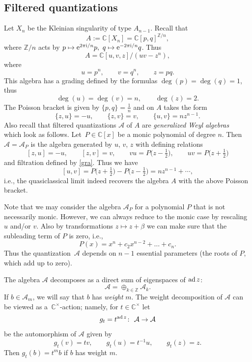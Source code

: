 \documentclass[10pt,a4paper]{amsart}
\newcommand{\CN}{\mathbb{C}} %
\newcommand{\ZN}{\mathbb{Z}} %
\newcommand{\ad}{\ensuremath\operatorname{ad}}
\newcommand{\mc}[1]{\mathcal{#1}}
\theoremstyle{definition}
\numberwithin{equation}{section}
\begin{document}
\subsection{Filtered quantizations}
Let $X_n$ be the Kleinian singularity of type $A_{n-1}$.
Recall that
\[
A:=\mathbb C[X_n]=\CN[p,q]^{\mathbb Z/n},
\]
where
$\mathbb Z/n$ acts by $p\mapsto {\rm e}^{2\pi {\rm i}/n}p,\ q\mapsto {\rm e}^{-2\pi {\rm i}/n}q$.
Thus
\[
A=\mathbb C[u,v,z]/(uv-z^n),
\]
where
\[
u=p^n,\qquad
v=q^n,\qquad
z=pq.
\]
This algebra has a grading defined by the formulas $\deg(p)=\deg(q)=1$, thus
\begin{equation}\label{gra}
 \deg(u)=\deg(v)=n,\qquad
 \deg(z)=2.
 \end{equation}
The Poisson bracket is given by $\lbrace{p,q\rbrace}=\frac{1}{n}$
and on $A$ takes the form
\[
 \lbrace z,u\rbrace =-u,\qquad
 \lbrace z,v\rbrace=v,\qquad
 \lbrace u,v\rbrace=nz^{n-1}.
\]
Also recall that filtered quantizations $\mathcal A$ of $A$ are {\it generalized Weyl algebras}~\cite{B} which look as follows. Let~$P\in \mathbb C[x]$ be a monic polynomial of degree $n$. Then $\mc{A}=\mc A_P$ is the algebra generated by $u$, $v$, $z$ with defining relations
\[
[z,u]=-u,\qquad
[z,v]=v,\qquad
vu=P\big(z-\tfrac{1}{2}\big),\qquad
uv=P\big(z+\tfrac{1}{2}\big)
\]
and filtration defined by \eqref{gra}.
Thus we have
\[
[u,v]=P\big(z+\tfrac{1}{2}\big)-P\big(z-\tfrac{1}{2}\big)=nz^{n-1}+\cdots ,
\]
i.e., the quasiclassical limit indeed recovers the algebra $A$ with the above Poisson bracket.

Note that we may consider the algebra $\mc A_P$ for a polynomial $P$ that is not necessarily monic. However, we can always reduce to the monic case by rescaling $u$ and/or $v$. Also by transformations $z\mapsto z+\beta$ we can make sure that the subleading term of $P$ is zero, i.e.,
\[
P(x)=x^n+c_2x^{n-2}+\dots +c_n.
\]
Thus the quantization~$\mc A$ depends on $n-1$ essential parameters (the roots of $P$, which add up to zero).

The algebra $\mc A$ decomposes as a direct sum of eigenspaces of
$\ad z$:
\[
\mc{A}=\oplus_{k\in \ZN}\mc{A}_{k}.
\]
If $b\in \mc A_m$, we will say that $b$ has {\it weight} $m$.
The weight decomposition of $\mc A$ can be viewed as a~$\mathbb C^\times$-action; namely, for $t\in \mathbb C^\times$ let
\begin{equation}\label{gt}
g_t=t^{\ad z}\colon \ \mc{A}\to \mc{A}
\end{equation}
be the automorphism of $\mc{A}$ given by
\[
g_t(v)= tv,\qquad
g_t(u)=t^{-1}u,\qquad
g_t(z)=z.
\]
Then $g_t(b)=t^mb$ if $b$ has weight $m$.
\end{document}
